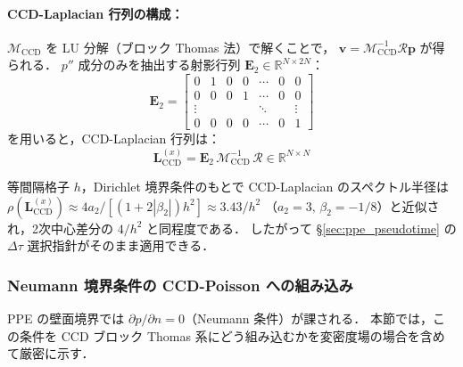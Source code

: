 \paragraph{CCD-Laplacian 行列の構成：}

$\mathcal{M}_{\mathrm{CCD}}$ を LU 分解（ブロック Thomas 法）で解くことで，
$\bm{v} = \mathcal{M}_{\mathrm{CCD}}^{-1}\mathcal{R}\bm{p}$ が得られる．
$p''$ 成分のみを抽出する射影行列 $\mathbf{E}_2 \in \mathbb{R}^{N \times 2N}$：
\begin{equation}
  \mathbf{E}_2 = \begin{bmatrix}
    0 & 1 & 0 & 0 & \cdots & 0 & 0 \\
    0 & 0 & 0 & 1 & \cdots & 0 & 0 \\
    \vdots & & & & \ddots & & \vdots \\
    0 & 0 & 0 & 0 & \cdots & 0 & 1
  \end{bmatrix}
  \label{eq:E2_proj}
\end{equation}
を用いると，CCD-Laplacian 行列は：
\begin{equation}
  \boxed{
    \mathbf{L}_{\mathrm{CCD}}^{(x)} = \mathbf{E}_2\,\mathcal{M}_{\mathrm{CCD}}^{-1}\,\mathcal{R}
    \in \mathbb{R}^{N \times N}
  }
  \label{eq:L_CCD_explicit}
\end{equation}

等間隔格子 $h$，Dirichlet 境界条件のもとで CCD-Laplacian のスペクトル半径は
$\rho(\mathbf{L}_{\mathrm{CCD}}^{(x)}) \approx 4a_2/[(1+2|\beta_2|)h^2] \approx 3.43/h^2$
（$a_2=3,\,\beta_2=-1/8$）と近似され，2次中心差分の $4/h^2$ と同程度である．
したがって §\ref{sec:ppe_pseudotime} の $\Delta\tau$ 選択指針がそのまま適用できる．

\subsubsection{Neumann 境界条件の CCD-Poisson への組み込み}
\label{sec:ccd_neumann_bc}

PPE の壁面境界では $\partial p/\partial n = 0$（Neumann 条件）が課される．
本節では，この条件を CCD ブロック Thomas 系にどう組み込むかを変密度場の場合を含めて厳密に示す．

